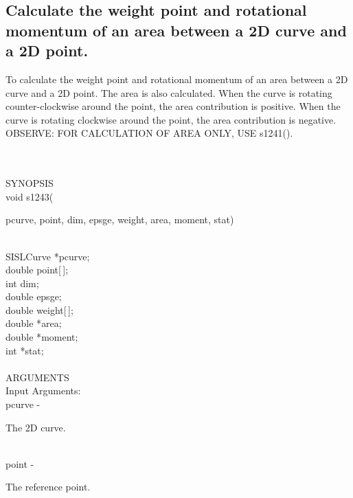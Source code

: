\subsection{Calculate the weight point and rotational momentum of
               an area between a 2D curve and a 2D point.}
\begin{minipg1}
To calculate the weight point and rotational momentum of
               an area between a 2D curve and a 2D point. The area is
               also calculated.
               When the curve is rotating counter-clockwise around the
               point, the area contribution is positive.
               When the curve is rotating clockwise around the point,
               the area contribution is negative.
               OBSERVE: FOR CALCULATION OF AREA ONLY, USE s1241().
\end{minipg1} \\ \\
SYNOPSIS\\
        \> void s1243(\begin{minipg3}
            {\fov pcurve},  {\fov point},  {\fov dim},  {\fov epsge},  {\fov weight},  {\fov area},  {\fov moment},  {\fov stat})
                \end{minipg3}\\
                \>\>    SISLCurve    \>  *{\fov pcurve};\\
                \>\>    double    \>  {\fov point}[\,];\\
                \>\>    int    \>  {\fov dim};\\
                \>\>    double    \>  {\fov epsge};\\
                \>\>    double    \>  {\fov weight}[\,];\\
                \>\>    double    \>  *{\fov area};\\
                \>\>    double    \>  *{\fov moment};\\
                \>\>    int    \>  *{\fov stat};\\
\\
ARGUMENTS\\
	\>Input Arguments:\\
        \>\>    {\fov pcurve}\> - \>  \begin{minipg2}
                     The 2D curve.
                               \end{minipg2}\\
        \>\>    {\fov point}\> - \>  \begin{minipg2}
                     The reference point.
                               \end{minipg2}\\
